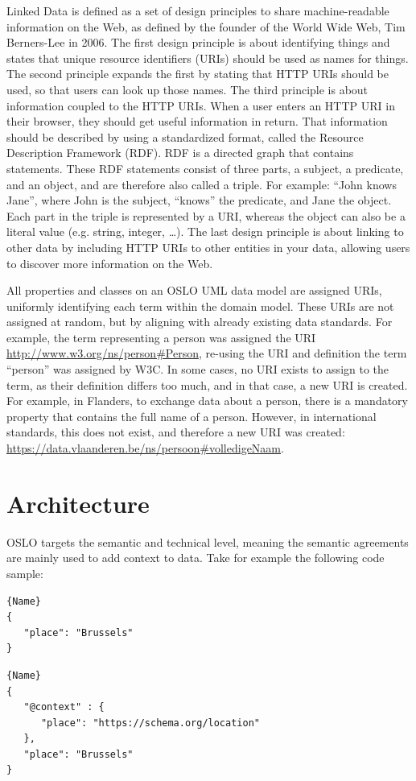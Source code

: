 \documentclass[manuscript]{acmart}
\begin{document}
Linked Data is defined as a set of design principles to share machine-readable information on the Web, as defined by the founder of the World Wide Web, Tim Berners-Lee in 2006. 
The first design principle is about identifying things and states that unique resource identifiers (URIs) should be used as names for things. 
The second principle expands the first by stating that HTTP URIs should be used, so that users can look up those names. 
The third principle is about information coupled to the HTTP URIs. 
When a user enters an HTTP URI in their browser, they should get useful information in return. 
That information should be described by using a standardized format, called the Resource Description Framework (RDF). 
RDF is a directed graph that contains statements. 
These RDF statements consist of three parts, a subject, a predicate, and an object, and are therefore also called a triple. 
For example: ``John knows Jane'', where John is the subject, ``knows'' the predicate, and Jane the object. 
Each part in the triple is represented by a URI, whereas the object can also be a literal value (e.g. string, integer, …). 
The last design principle is about linking to other data by including HTTP URIs to other entities in your data, allowing users to discover more information on the Web.

All properties and classes on an OSLO UML data model are assigned URIs, uniformly identifying each term within the domain model.
These URIs are not assigned at random, but by aligning with already existing data standards. 
For example, the term representing a person was assigned the URI \url{http://www.w3.org/ns/person#Person}, re-using the URI and definition the term ``person'' was assigned by W3C.
In some cases, no URI exists to assign to the term, as their definition differs too much, and in that case, a new URI is created.
For example, in Flanders, to exchange data about a person, there is a mandatory property that contains the full name of a person.
However, in international standards, this does not exist, and therefore a new URI was created: \url{https://data.vlaanderen.be/ns/persoon#volledigeNaam}.

\section{Architecture}

OSLO targets the semantic and technical level, meaning the semantic agreements are mainly used to add context to data. Take for example the following code sample:
\noindent
\begin{lstlisting}[caption=JSON data snippet,frame=tlrb, label={lst:json}]{Name}
{
   "place": "Brussels"
}
\end{lstlisting}\hfill
\begin{lstlisting}[caption=JSON-LD data snippet,frame=tlrb, label={lst:jsonld}]{Name}
{
   "@context" : {
      "place": "https://schema.org/location"
   },
   "place": "Brussels"
}
\end{lstlisting}
\end{document}
